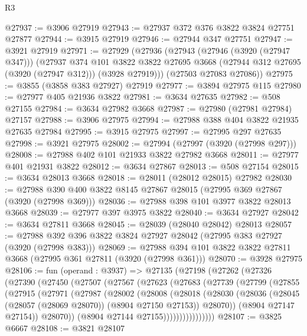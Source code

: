 \begin{lexlean}{R3}
\begin{coremodule}
@27937 := @3906 @27919
@27943 := @27937 @372 @376 @3822 @3824 @27751 @27877
@27944 := @3915 @27919
@27946 := @27944 @347 @27751
@27947 := @3921 @27919
@27971 := @27929
    (@27936
      (@27943
        (@27946 (@3920 (@27947 @347)))
        (@27937
          @374
          @101
          @3822
          @3822
          @27695
          @3668
          (@27944 @312 @27695 (@3920 (@27947 @312)))
          (@3928 @27919)))
      (@27503 @27083 @27086))
@27975 := @3855 (@3858 @383 @27927) @27919
@27977 := @3894 @27975 @115
@27980 := @27977 @405 @21936 @3822
@27981 := @3634 @27635
@27982 := @508 @27155
@27984 := @3634 @27982 @3668
@27987 := @27980 (@27981 @27984) @27157
@27988 := @3906 @27975
@27994 := @27988 @388 @404 @3822 @21935 @27635 @27984
@27995 := @3915 @27975
@27997 := @27995 @297 @27635
@27998 := @3921 @27975
@28002 := @27994 (@27997 (@3920 (@27998 @297)))
@28008 := @27988 @402 @101 @21933 @3822 @27982 @3668
@28011 := @27977 @401 @21931 @3822
@28012 := @3634 @27867
@28013 := @508 @27154
@28015 := @3634 @28013 @3668
@28018 := @28011 (@28012 @28015) @27982
@28030 := @27988 @390 @400 @3822 @8145 @27867 @28015 (@27995 @369 @27867 (@3920 (@27998 @369)))
@28036 := @27988 @398 @101 @3977 @3822 @28013 @3668
@28039 := @27977 @397 @3975 @3822
@28040 := @3634 @27927
@28042 := @3634 @27811 @3668
@28045 := @28039 (@28040 @28042) @28013
@28057 := @27988 @392 @396 @3822 @3824 @27927 @28042 (@27995 @383 @27927 (@3920 (@27998 @383)))
@28069 := @27988 @394 @101 @3822 @3822 @27811 @3668 (@27995 @361 @27811 (@3920 (@27998 @361)))
@28070 := @3928 @27975
@28106 := fun (operand : @3937) =>
  @27135
    (@27198
      (@27262
        (@27326
          (@27390
            (@27450
              (@27507
                (@27567
                  (@27623
                    (@27683
                      (@27739
                        (@27799
                          (@27855
                            (@27915
                              (@27971
                                (@27987
                                  (@28002
                                    (@28008
                                      (@28018
                                        (@28030
                                          (@28036
                                            (@28045 (@28057 (@28069 @28070)) (@8904 @27150 @27153))
                                            @28070))
                                        (@8904 @27147 @27154))
                                      @28070))
                                  (@8904 @27144 @27155))))))))))))))))
@28107 := @3825 @6667
@28108 := @3821 @28107

\end{coremodule}
\end{lexlean}
